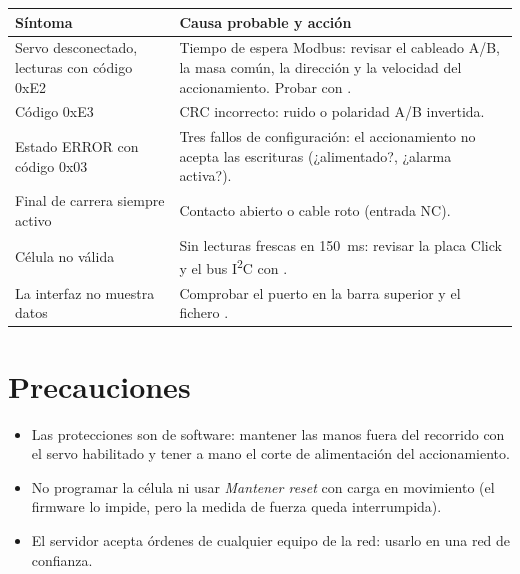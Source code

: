 \begin{longtable}{@{}L{0.34\textwidth}L{0.6\textwidth}@{}}
\toprule
Síntoma & Causa probable y acción \\
\midrule
\endhead
Servo desconectado, lecturas con código 0xE2 & Tiempo de espera Modbus: revisar el cableado A/B, la masa común, la dirección y la velocidad del accionamiento. Probar con . \\
Código 0xE3 & CRC incorrecto: ruido o polaridad A/B invertida. \\
Estado ERROR con código 0x03 & Tres fallos de configuración: el accionamiento no acepta las escrituras (¿alimentado?, ¿alarma activa?). \\
Final de carrera siempre activo & Contacto abierto o cable roto (entrada NC). \\
Célula no válida & Sin lecturas frescas en \SI{150}{\milli\second}: revisar la placa Click y el bus I\textsuperscript{2}C con . \\
La interfaz no muestra datos & Comprobar el puerto en la barra superior y el fichero . \\
\bottomrule
\end{longtable}

\section{Precauciones}
\begin{itemize}
  \item Las protecciones son de software: mantener las manos fuera del recorrido con el servo
        habilitado y tener a mano el corte de alimentación del accionamiento.
  \item No programar la célula ni usar \emph{Mantener reset} con carga en movimiento (el firmware lo
        impide, pero la medida de fuerza queda interrumpida).
  \item El servidor acepta órdenes de cualquier equipo de la red: usarlo en una red de confianza.
\end{itemize}
